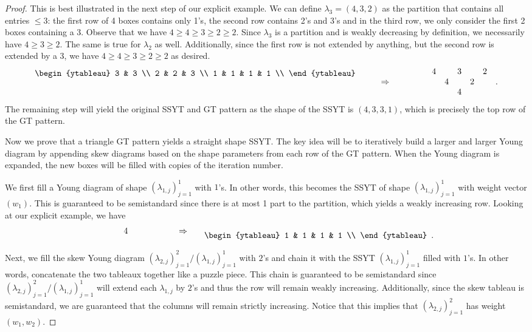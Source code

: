 \documentclass[10pt]{article}
\theoremstyle{plain}
\theoremstyle{definition}
\newcommand{\Rar}{\Rightarrow}
\begin{document}
\begin{proof}
This is best illustrated in the next step of our explicit example. We can define $\lambda_3 = (4,3,2)$ as the partition that contains all entries $\leq 3$: the first row of 4 boxes contains only 1's, the second row contains 2's and 3's and in the third row, we only consider the first 2 boxes containing a 3. Observe that we have $4 \geq 4 \geq 3 \geq 2 \geq 2$. Since $\lambda_3$ is a partition and is weakly decreasing by definition, we necessarily have $4 \geq 3 \geq 2$. The same is true for $\lambda_2$ as well. Additionally, since the first row is not extended by anything, but the second row is extended by a 3, we have $4 \geq 4 \geq 3 \geq 2 \geq 2$ as desired.
\[
\begin{ytableau} 
3 & 3  \\
2 & 2 & 3 \\ 
1 & 1 & 1 & 1 \\ 
\end{ytableau} \quad\qquad \raisebox{-10pt}{$\Rar$} \qquad\qquad \raisebox{-10pt}{$\begin{matrix}
& 4 & & 3 & & 2 & \\ 
& & 4 & & 2 & & \\ 
& & & 4 & & & 
\end{matrix}$.}
\]
The remaining step will yield the original SSYT and GT pattern as the shape of the SSYT is $(4,3,3,1)$, which is precisely the top row of the GT pattern.

Now we prove that a triangle GT pattern yields a straight shape SSYT. The key idea will be to iteratively build a larger and larger Young diagram by appending skew diagrams based on the shape parameters from each row of the GT pattern.  When the Young diagram is expanded, the new boxes will be filled with copies of the iteration number.

We first fill a Young diagram of shape $(\lambda_{1,j})_{j=1}^1$ with $1$'s. In other words, this becomes the SSYT of shape $(\lambda_{1,j})_{j=1}^1$ with weight vector $(w_1)$. This is guaranteed to be semistandard since there is at most 1 part to the partition, which yields a weakly increasing row. Looking at our explicit example, we have
\[
\raisebox{5pt}{$\begin{matrix}
& & & 4 & & & 
\end{matrix}$}
\quad\qquad \raisebox{5pt}{$\Rar$} \qquad \begin{ytableau} 
1 & 1 & 1 & 1 \\ 
\end{ytableau}\enskip.
\]

Next, we fill the skew Young diagram $(\lambda_{2,j})_{j=1}^2 / (\lambda_{1,j})_{j=1}^1$ with $2$'s and chain it with the SSYT $(\lambda_{1,j})_{j=1}^1$ filled with $1$'s. In other words, concatenate the two tableaux together like a puzzle piece. This chain is guaranteed to be semistandard since $(\lambda_{2,j})_{j=1}^2 / (\lambda_{1,j})_{j=1}^1$ will extend each $\lambda_{1,j}$ by $2$'s and thus the row will remain weakly increasing. Additionally, since the skew tableau is semistandard, we are guaranteed that the columns will remain strictly increasing. Notice that this implies that $(\lambda_{2,j})_{j=1}^2$ has weight $(w_1, w_2)$.


\end{proof}
\end{document}
